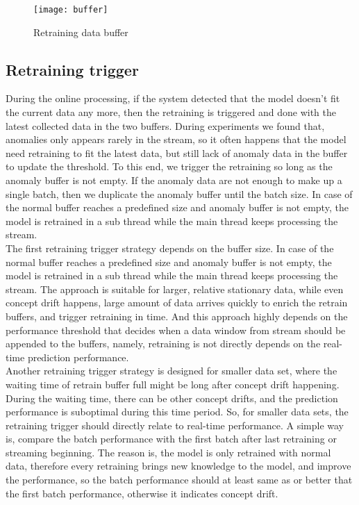 \begin{figure}[h]
\centering
\texttt{[image: buffer]}
\caption[Retraining data buffer]{Retraining data buffer}
\label{fig:buffer}
\end{figure}


\subsection{Retraining trigger}
\label{trigger}

During the online processing, if the system detected that the model doesn’t fit the current data any more, then the retraining is triggered and done with the latest collected data in the two buffers. During experiments we found that, anomalies only appears rarely in the stream, so it often happens that the model need retraining to fit the latest data, but still lack of anomaly data in the buffer to update the threshold. To this end, we trigger the retraining so long as the anomaly buffer is not empty. If the anomaly data are not enough to make up a single batch, then we duplicate the anomaly buffer until the batch size. In case of the normal buffer reaches a predefined size and anomaly buffer is not empty, the model is retrained in a sub thread while the main thread keeps processing the stream.\\
The first retraining trigger strategy depends on the buffer size. In case of the normal buffer reaches a predefined size and anomaly buffer is not empty, the model is retrained in a sub thread while the main thread keeps processing the stream. The approach is suitable for larger, relative stationary data, while even concept drift happens, large amount of data arrives quickly to enrich the retrain buffers, and trigger retraining in time. And this approach highly depends on the performance threshold that decides when a data window from stream should be appended to the buffers, namely, retraining is not directly depends on the real-time prediction performance. \\
Another retraining trigger strategy is designed for smaller data set, where the waiting time of retrain buffer full might be long after concept drift happening. During the waiting time, there can be other concept drifts, and the prediction performance is suboptimal during this time period. So, for smaller data sets, the retraining trigger should directly relate to real-time performance. A simple way is, compare the batch performance with the first batch after last retraining or streaming beginning. The reason is, the model is only retrained with normal data, therefore every retraining brings new knowledge to the model, and improve the performance, so the batch performance should at least same as or better that the first batch performance, otherwise it indicates concept drift.\\


